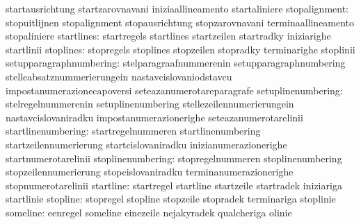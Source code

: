                                   startausrichtung                 startzarovnavani
                                  iniziaallineamento               startaliniere
                   stopalignment: stopuitlijnen                    stopalignment
                                  stopausrichtung                  stopzarovnavani
                                  terminaallineamento              stopaliniere
                      startlines: startregels                      startlines
                                  startzeilen                      startradky
                                  iniziarighe                      startlinii
                       stoplines: stopregels                       stoplines
                                  stopzeilen                       stopradky
                                  terminarighe                     stoplinii
         setupparagraphnumbering: stelparagraafnummerenin          setupparagraphnumbering
                                  stelleabsatznummerierungein      nastavcislovaniodstavcu
                                  impostanumerazionecapoversi      seteazanumerotareparagrafe
              setuplinenumbering: stelregelnummerenin              setuplinenumbering
                                  stellezeilennumerierungein       nastavcislovaniradku
                                  impostanumerazionerighe          seteazanumerotarelinii
              startlinenumbering: startregelnummeren               startlinenumbering
                                  startzeilennumerierung           startcislovaniradku
                                  inizianumerazionerighe           startnumerotarelinii
               stoplinenumbering: stopregelnummeren                stoplinenumbering
                                  stopzeilennumerierung            stopcislovaniradku
                                  terminanumerazionerighe          stopnumerotarelinii
                       startline: startregel                       startline
                                  startzeile                       startradek
                                  iniziariga                       startlinie
                        stopline: stopregel                        stopline
                                  stopzeile                        stopradek
                                  terminariga                      stoplinie
                        someline: eenregel                         someline
                                  einezeile                        nejakyradek
                                  qualcheriga                      olinie
